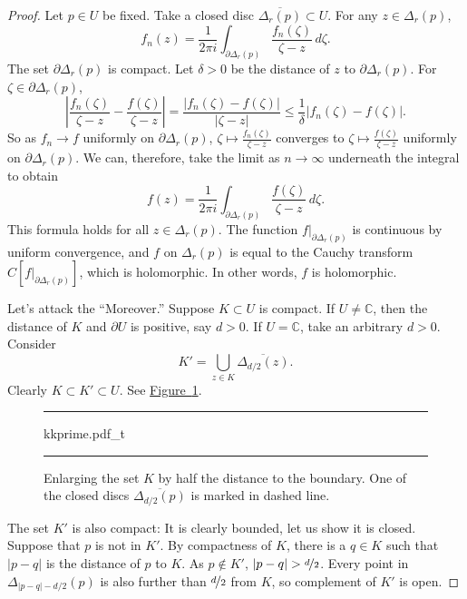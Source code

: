 \documentclass[12pt,openany]{book}
\newcommand{\sabs}[1]{\lvert {#1} \rvert}
\newcommand{\abs}[1]{\left\lvert {#1} \right\rvert}
\newcommand{\C}{{\mathbb{C}}}
\newcommand{\myquote}[1]{``#1''}
\theoremstyle{plain}
\theoremstyle{remark}
\theoremstyle{definition}
\newenvironment{myfig}{%
\begin{figure}[h!t]
\noindent\rule{\textwidth}{0.5pt}\vspace{12pt}\par\centering}%
{\par\noindent\rule{\textwidth}{0.5pt}
\end{figure}}
\theoremstyle{exercise}
\theoremstyle{example}
\newcommand{\figureref}[1]{\hyperref[#1]{Figure~\ref*{#1}}}
\begin{document}
\begin{proof}
Let $p \in U$ be fixed.
Take a closed disc $\overline{\Delta_r(p)} \subset U$.
For any $z \in \Delta_r(p)$,
\begin{equation*}
f_n(z) = \frac{1}{2\pi i}
\int_{\partial \Delta_r(p)} \frac{f_n(\zeta)}{\zeta-z} \, d\zeta .
\end{equation*}
The set $\partial \Delta_r(p)$ is compact.
Let $\delta > 0$ be the distance of $z$ to
$\partial \Delta_r(p)$.
For $\zeta \in \partial \Delta_r(p)$,
\begin{equation*}
\abs{\frac{f_n(\zeta)}{\zeta-z}
-
\frac{f(\zeta)}{\zeta-z}
}
=
\frac{\sabs{f_n(\zeta)-f(\zeta)}}{\sabs{\zeta-z}}
\leq
\frac{1}{\delta}
\sabs{f_n(\zeta)-f(\zeta)} .
\end{equation*}
So as $f_n \to f$ uniformly on $\partial \Delta_r(p)$,
$\zeta \mapsto \frac{f_n(\zeta)}{\zeta-z}$ converges to 
$\zeta \mapsto \frac{f(\zeta)}{\zeta-z}$ uniformly on $\partial \Delta_r(p)$.
We can, therefore, take the limit as $n \to \infty$ underneath the integral
to obtain
\begin{equation*}
f(z) = \frac{1}{2\pi i}
\int_{\partial \Delta_r(p)} \frac{f(\zeta)}{\zeta-z} \, d\zeta .
\end{equation*}
This formula holds for all $z \in \Delta_r(p)$.
The function $f|_{\partial \Delta_r(p)}$ is continuous by uniform
convergence, and $f$ on $\Delta_r(p)$ is equal to
the Cauchy transform
$C[f|_{\partial \Delta_r(p)}]$, which is holomorphic.  In other words,
$f$ is holomorphic.

Let's attack the \myquote{Moreover.}
Suppose $K \subset U$ is compact.  If $U \not= \C$, then the distance of
$K$ and $\partial U$ is positive, say $d > 0$.
If $U=\C$, take an arbitrary $d > 0$.  Consider 
\begin{equation*}
K' = \bigcup_{z \in K} \overline{\Delta_{d/2}(z)} .
\end{equation*}
Clearly $K \subset K' \subset U$.
See \figureref{fig:kkprime}.

\begin{myfig}
{kkprime.pdf_t}
\caption{Enlarging the set $K$ by half the distance to the boundary.  One of
the closed discs $\overline{\Delta_{d/2}(p)}$ is marked in dashed line.\label{fig:kkprime}}
\end{myfig}

The set $K'$ is also compact: It is clearly
bounded, let us show it is closed.  Suppose that $p$ is not in $K'$.
By compactness of $K$, there is a $q \in K$ such that $\sabs{p-q}$
is the distance of $p$ to $K$.  As $p \not\in K'$,
$\sabs{p-q} > \nicefrac{d}{2}$.
Every point in $\Delta_{\sabs{p-q}-d/2}(p)$
is also further than $\nicefrac{d}{2}$ from $K$, so
complement of $K'$ is open.


\end{proof}
\end{document}
